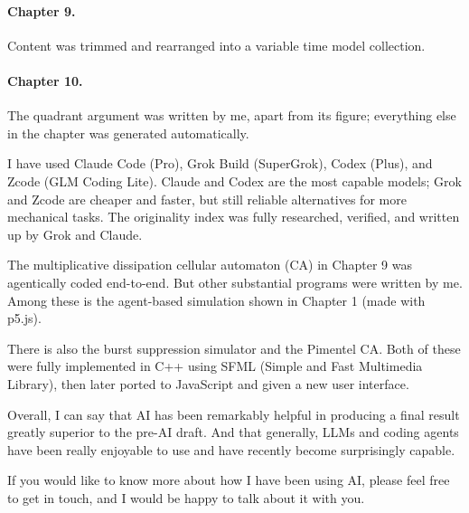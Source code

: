 \paragraph{Chapter 9.}
Content was trimmed and rearranged into a variable time model collection.

\paragraph{Chapter 10.}
The quadrant argument was written by me, apart from its figure; everything else in the chapter was generated automatically.

\medskip
I have used Claude Code (Pro), Grok Build (SuperGrok), Codex (Plus),  and Zcode (GLM Coding Lite). Claude and Codex are the most capable models; Grok and Zcode are cheaper and faster, but still reliable alternatives for more mechanical tasks. The originality index was fully researched, verified, and written up by Grok and Claude.

The multiplicative dissipation cellular automaton (CA) in Chapter 9 was agentically coded end-to-end. But other substantial programs were written by me. Among these is the agent-based simulation shown in Chapter 1 (made with p5.js).

There is also the burst suppression simulator and the Pimentel CA. Both of these were fully implemented in C++ using SFML (Simple and Fast Multimedia Library), then later ported to JavaScript and given a new user interface.

Overall, I can say that AI has been remarkably helpful in producing a final result greatly superior to the pre-AI draft. And that generally, LLMs and coding agents have been really enjoyable to use and have recently become surprisingly capable.

If you would like to know more about how I have been using AI, please feel free to get in touch, and I would be happy to talk about it with you.

